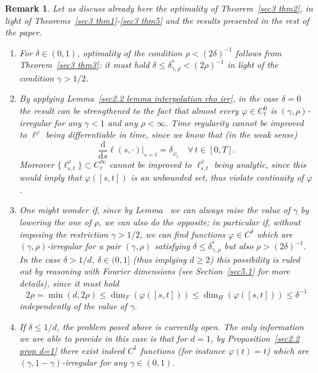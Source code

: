 \documentclass[10pt]{article}
\newcommand{\mathd}{\mathrm{d}}
\newcommand{\nobracket}{}
\newcommand{\tmcolor}[2]{{\color{#1}{#2}}}
\newtheorem{remark}[theorem]{Remark}
\begin{document}
\begin{remark}
  \label{sec5.2 discussion optimality}Let us discuss already here the
  optimality of Theorem~\ref{sec3 thm2}, in light of Theorems~\ref{sec3
  thm1}\mbox{-}\ref{sec3 thm5} and the results presented in the rest of the
  paper.
  \begin{enumerate}[label=\arabic*.]
    \item For $\delta \in (0, 1)$, optimality of the condition $\rho < (2
    \delta)^{- 1}$ follows from Theorem~\ref{sec3 thm3}: it must hold $\delta
    \leqslant \delta^{\ast}_{\gamma, \rho} < (2 \rho)^{- 1}$ in light of the
    condition $\gamma > 1 / 2$.
    
    \item By applying Lemma~\ref{sec2.2 lemma interpolation rho irr}, in the
    case $\delta = 0$ the result can be strengthened to the fact that almost
    every $\varphi \in C^0_t$ is $(\gamma, \rho)$\mbox{-}irregular for any
    $\gamma < 1$ and any $\rho < \infty$. Time regularity cannot be improved
    to $\ell^{\varphi}$ being differentiable in time, since we know that (in
    the weak sense)
    \[ \frac{\mathd}{\mathd s} \ell (s, \cdot) |_{s = t} \nobracket =
       \delta_{\varphi_t} \quad \forall \, t \in [0, T] . \]
    Moreover $\{ \ell_{s, t}^{\varphi} \} \subset C^{\infty}_c$ cannot be
    improved to $\ell^{\varphi}_{s, t}$ being analytic, since this would imply
    that $\varphi ([s, t])$ is an unbounded set, thus violate continuity of
    $\varphi$.
    
    \item One might wonder if, since by Lemma~\tmcolor{blue}{\ref{sec2.2 lemma
    interpolation rho irr}} we can always raise the value of $\gamma$ by
    lowering the one of $\rho$, we can also do the opposite; in particular if,
    without imposing the restriction $\gamma > 1 / 2$, we can find functions
    $\varphi \in C^{\delta}$ which are $(\gamma, \rho)$-irregular for a pair
    $(\gamma, \rho)$ satisfying $\delta \leqslant \delta^{\ast}_{\gamma,
    \rho}$ but also $\rho > (2 \delta)^{- 1}$. In the case $\delta> 1/d$, $\delta\in (0,1]$ (thus implying $d\geqslant 2$)
    this possibility is ruled out by reasoning with Fourier dimensions (see
    Section~\ref{sec5.1} for more details), since it must hold
    \[ 2 \rho = \min (d, 2 \rho) \leqslant \dim_F (\varphi ([s, t])) \leqslant
       \dim_H (\varphi ([s, t])) \leqslant \delta^{- 1} \]
    independently of the value of $\gamma$.
    
    \item If $\delta \leqslant 1 / d$, the problem posed above is currently
    open. The only information we are able to provide in this case is that for
    $d = 1$, by Proposition~\ref{sec2.2 prop d=1} there exist indeed $C^1$
    functions (for instance $\varphi (t) = t$) which are $(\gamma, 1 -
    \gamma)$\mbox{-}irregular for any $\gamma \in (0, 1)$.
    

\end{enumerate}
\end{remark}
\end{document}
